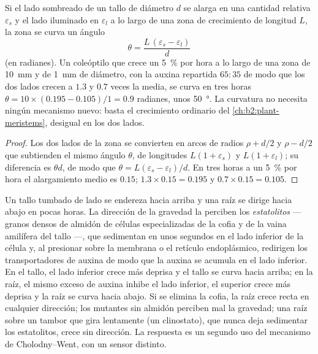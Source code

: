 \begin{theorem}\label{thm:b2:plant-plasticity:bend}
Si el lado sombreado de un tallo de diámetro $d$ se alarga en una cantidad
relativa $\varepsilon_s$ y el lado iluminado en $\varepsilon_l$ a lo largo
de una zona de crecimiento de longitud $L$, la zona se curva un ángulo
\[
\theta = \frac{L\,(\varepsilon_s - \varepsilon_l)}{d}
\]
(en radianes). Un coleóptilo que crece un \qty{5}{\%} por hora a lo largo
de una zona de \qty{10}{mm} y de \qty{1}{mm} de diámetro, con la auxina
repartida
$65 : 35$ de modo que los dos lados crecen a $1.3$ y $0.7$ veces la media,
se curva en tres horas $\theta = 10\times(0.195 - 0.105)/1 =
0.9$ radianes, unos \qty{50}{\degree}. La curvatura no necesita ningún
mecanismo nuevo: basta el crecimiento ordinario del
\cref{ch:b2:plant-meristems}, desigual en los dos lados.
\end{theorem}
\begin{proof}
Los dos lados de la zona se convierten en arcos de radios $\rho + d/2$ y
$\rho - d/2$ que subtienden el mismo ángulo $\theta$, de longitudes $L(1 +
\varepsilon_s)$ y $L(1 + \varepsilon_l)$; su diferencia es
$\theta d$, de modo que $\theta = L(\varepsilon_s - \varepsilon_l)/d$. En
tres horas a un \qty{5}{\%} por hora el alargamiento medio es $0.15$;
$1.3\times 0.15 = 0.195$ y $0.7\times 0.15 = 0.105$.
\end{proof}

\begin{proposition}[El gravitropismo]\label{prop:b2:plant-plasticity:gravitropism}
Un tallo tumbado de lado se endereza hacia arriba y una raíz se dirige
hacia abajo en pocas horas. La dirección de la gravedad la perciben los
\emph{estatolitos} --- granos densos de almidón de células especializadas
de la cofia y de la vaina amilífera del tallo ---, que sedimentan en unos
segundos en el lado inferior de la célula y, al presionar sobre la
membrana o el retículo endoplásmico, redirigen los transportadores de
auxina de modo que la auxina se acumula en el lado inferior. En el tallo,
el lado inferior crece más deprisa y el tallo se curva hacia arriba; en
la raíz, el mismo exceso de auxina inhibe el lado inferior, el superior
crece más deprisa y la raíz se curva hacia abajo. Si se elimina la cofia,
la raíz crece recta en cualquier dirección; los mutantes sin almidón
perciben mal la gravedad; una raíz sobre un tambor que gira lentamente
(un clinostato), que nunca deja sedimentar los estatolitos, crece sin
dirección. La respuesta es un segundo uso del mecanismo de
Cholodny--Went, con un sensor distinto.
\end{proposition}

